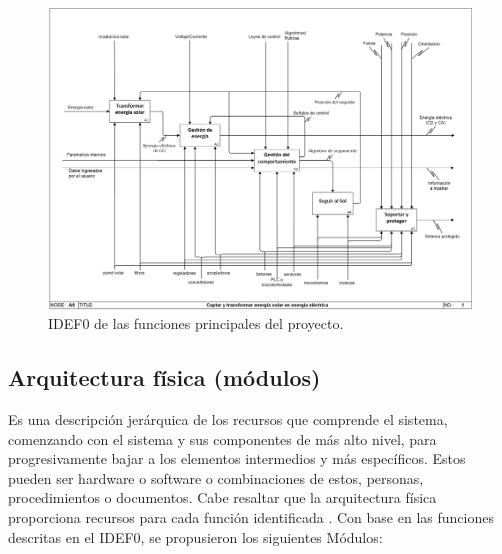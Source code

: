 \begin{landscape}
	\begin{figure}[H]
		\centering
		\includegraphics[width=20cm]{imagenes/idef0}
		\caption{IDEF0 de las funciones principales del proyecto.}
		\label{fig:idef0}
	\end{figure}
\end{landscape}
%
\subsection{Arquitectura física (módulos)}
Es una descripción jerárquica de los recursos que comprende el sistema, comenzando con el sistema y sus componentes de más alto nivel, para progresivamente bajar a los elementos intermedios y más específicos. Estos pueden ser hardware o software o combinaciones de estos, personas, procedimientos o documentos. Cabe resaltar que la arquitectura física proporciona recursos para cada función identificada \cite{DC4}. Con base en las funciones descritas en el IDEF0, se propusieron los siguientes Módulos:

